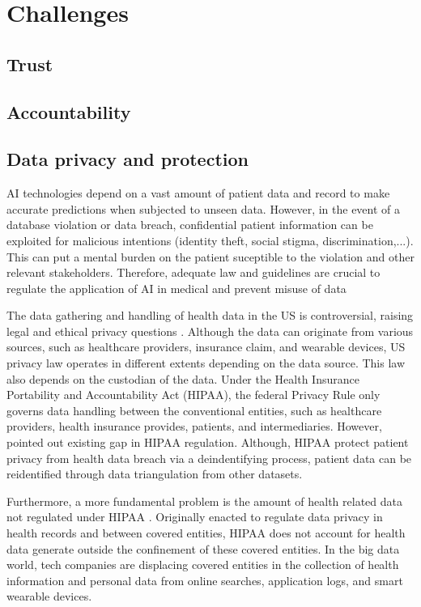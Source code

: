 \documentclass{article}
\begin{document}
\section{Challenges}
\subsection{Trust}
\subsection{Accountability}
\subsection{Data privacy and protection}
AI technologies depend on a vast amount of patient data and record to make accurate predictions when subjected to unseen data.
However, in the event of a database violation or data breach, confidential patient information can be exploited for malicious intentions (identity theft, social stigma, discrimination,...).
This can put a mental burden on the patient suceptible to the violation and other relevant stakeholders.
Therefore, adequate law and guidelines are crucial to regulate the application of AI in medical and prevent misuse of data


The data gathering and handling of health data in the US is controversial, raising legal and ethical privacy questions \cite{price_privacy_2019}.
Although the data can originate from various sources, such as healthcare providers, insurance claim, and wearable devices, US privacy law operates in different extents depending on the data source.
This law also depends on the custodian of the data. Under the Health Insurance Portability and Accountability Act (HIPAA), the federal Privacy Rule only governs data handling between the conventional entities, such as healthcare providers, health insurance provides, patients, and intermediaries. 
However, \cite{price_privacy_2019} pointed out existing gap in HIPAA regulation.
Although, HIPAA protect patient privacy from health data breach via a deindentifying process, patient data can be reidentified through data triangulation from other datasets.


Furthermore, a more fundamental problem is the amount of health related data not regulated under HIPAA \cite{price_privacy_2019}. 
Originally enacted to regulate data privacy in health records and between covered entities, HIPAA does not account for health data generate outside the confinement of these covered entities. 
In the big data world, tech companies are displacing covered entities in the collection of health information and personal data from online searches, application logs, and smart wearable devices.
\end{document}
